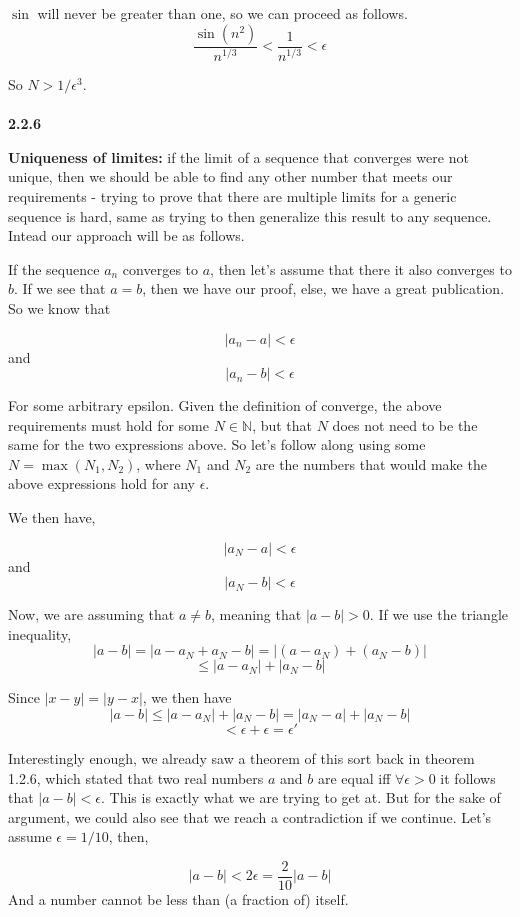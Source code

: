 $\sin$ will never be greater than one, so we can proceed as follows.
$$
\frac{\sin (n^2)}{n^{1/3}} < \frac{1}{n^{1/3}} < \epsilon
$$

So $N > 1 / \epsilon^3$.
\\~\\



\textbf{2.2.6}

\textbf{Uniqueness of limites:} if the limit of a sequence that converges were not unique, then we
should be able to find any other number that meets our requirements - trying
to prove that there are multiple limits for a generic sequence is hard, same as trying to then
generalize this result to any sequence.
Intead our approach will be as follows.

If the sequence $a_n$ converges to $a$, then let's assume that there it also converges to $b$.
If we see that $a = b$, then we have our proof, else, we have a great publication.
So we know that

$$
| a_n - a | < \epsilon
$$
and
$$
| a_n - b | < \epsilon
$$

For some arbitrary epsilon.
Given the definition of converge, the above requirements must hold for some $N \in \mathbb{N}$, but
that $N$ does not need to be the same for the two expressions above.
So let's follow along using some $N = \max (N_1, N_2)$, where $N_1$ and $N_2$ are the numbers that would
make the above expressions hold for any $\epsilon$.

We then have,

$$
| a_N - a | < \epsilon
$$
and
$$
| a_N - b | < \epsilon
$$

Now, we are assuming that $a \neq b$, meaning that $| a - b | > 0$.
If we use the triangle inequality,
$$
| a - b | = | a - a_N + a_N - b | = | (a - a_N) + (a_N - b) |
$$
$$
\leq | a - a_N | + | a_N - b |
$$

Since $|x-y| = |y-x|$, we then have
$$
| a - b | \leq | a - a_N | + | a_N - b | = | a_N - a | + | a_N - b |
$$
$$
< \epsilon + \epsilon = \epsilon'
$$

Interestingly enough, we already saw a theorem of this sort back in theorem 1.2.6, which stated that
two real numbers $a$ and $b$ are equal iff $\forall \epsilon > 0$ it follows that $|a-b|<\epsilon$.
This is exactly what we are trying to get at.
But for the sake of argument, we could also see that we reach a contradiction if we continue.
Let's assume $\epsilon = 1/10$, then,

$$
|a-b| < 2\epsilon = \frac{2}{10}|a-b|
$$
And a number cannot be less than (a fraction of) itself.
\\~\\





